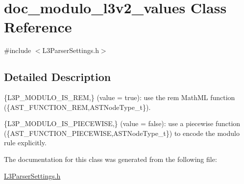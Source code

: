 \hypertarget{classdoc__modulo__l3v2__values}{}\section{doc\+\_\+modulo\+\_\+l3v2\+\_\+values Class Reference}
\label{classdoc__modulo__l3v2__values}


{\ttfamily \#include $<$L3\+Parser\+Settings.\+h$>$}



\subsection{Detailed Description}

\begin{DoxyItemize}
\item \{L3\+P\+\_\+\+M\+O\+D\+U\+L\+O\+\_\+\+I\+S\+\_\+\+R\+EM,\} (value = {\ttfamily true})\+: use the \textquotesingle{}rem\textquotesingle{} Math\+ML function (\{A\+S\+T\+\_\+\+F\+U\+N\+C\+T\+I\+O\+N\+\_\+\+R\+EM,A\+S\+T\+Node\+Type\+\_\+t\}). 
\item \{L3\+P\+\_\+\+M\+O\+D\+U\+L\+O\+\_\+\+I\+S\+\_\+\+P\+I\+E\+C\+E\+W\+I\+SE,\} (value = {\ttfamily false})\+: use a piecewise function (\{A\+S\+T\+\_\+\+F\+U\+N\+C\+T\+I\+O\+N\+\_\+\+P\+I\+E\+C\+E\+W\+I\+SE,A\+S\+T\+Node\+Type\+\_\+t\}) to encode the modulo rule explicitly. 
\end{DoxyItemize}

The documentation for this class was generated from the following file\+:\begin{DoxyCompactItemize}
\item 
\hyperlink{_l3_parser_settings_8h}{L3\+Parser\+Settings.\+h}\end{DoxyCompactItemize}
